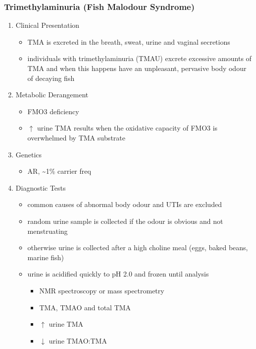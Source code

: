 \documentclass{scrartcl}
\begin{document}
\subsubsection{Trimethylaminuria (Fish Malodour Syndrome)}
\label{sec:orgda22a47}
\begin{enumerate}
\item Clinical Presentation
\label{sec:orgd853b80}
\begin{itemize}
\item TMA is excreted in the breath, sweat, urine and vaginal secretions
\item individuals with trimethylaminuria (TMAU) excrete excessive amounts
of TMA and when this happens have an unpleasant, pervasive body
odour of decaying fish
\end{itemize}

\item Metabolic Derangement
\label{sec:org57ee84e}
\begin{itemize}
\item FMO3 deficiency
\item \(\uparrow\) urine TMA results when the oxidative capacity of FMO3 is
overwhelmed by TMA substrate
\end{itemize}

\item Genetics
\label{sec:org849799f}
\begin{itemize}
\item AR, \textasciitilde{}1\% carrier freq
\end{itemize}

\item Diagnostic Tests
\label{sec:orgc68208c}
\begin{itemize}
\item common causes of abnormal body odour and UTIs are excluded
\item random urine sample is collected if the odour is obvious and not
menstruating
\item otherwise urine is collected after a high choline meal (eggs, baked
beans, marine fish)
\item urine is acidified quickly to pH 2.0 and frozen until analysis
\begin{itemize}
\item NMR spectroscopy or mass spectrometry
\item TMA, TMAO and total TMA
\item \(\uparrow\) urine TMA
\item \(\downarrow\) urine TMAO:TMA
\end{itemize}
\end{itemize}


\end{enumerate}
\end{document}
